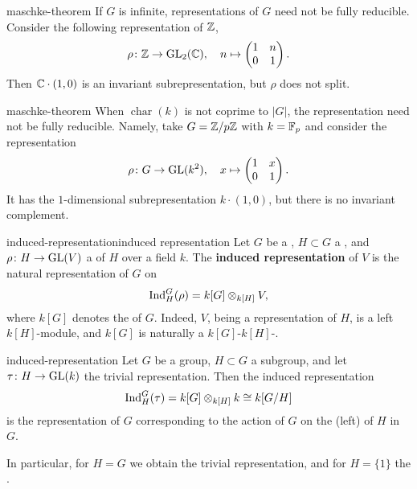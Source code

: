 \begin{example}{maschke-theorem}
    If $G$ is infinite, representations of $G$ need not be fully reducible. Consider the following representation of $\mathbb{Z}$,
    \[ \rho \colon \mathbb{Z} \to \textup{GL}_2(\mathbb{C}), \quad n \mapsto \begin{pmatrix} 1 & n \\ 0 & 1 \end{pmatrix} . \]
    Then $\mathbb{C} \cdot (1, 0)$ is an invariant subrepresentation, but $\rho$ does not split.
\end{example}

\begin{example}{maschke-theorem}
    When $\operatorname{char}(k)$ is not coprime to $|G|$, the representation need not be fully reducible. Namely, take $G = \mathbb{Z}/p\mathbb{Z}$ with $k = \mathbb{F}_p$ and consider the representation
    \[ \rho \colon G \to \textup{GL}(k^2), \quad x \mapsto \begin{pmatrix} 1 & x \\ 0 & 1 \end{pmatrix} . \]
    It has the $1$-dimensional subrepresentation $k \cdot (1, 0)$, but there is no invariant complement.
\end{example}

\begin{topic}{induced-representation}{induced representation}
    Let $G$ be a , $H \subset G$ a , and $\rho \colon H \to \textup{GL}(V)$ a  of $H$ over a field $k$. The \textbf{induced representation} of $V$ is the natural representation of $G$ on
    \[ \textup{Ind}_H^G (\rho) = k[G] \otimes_{k[H]} V , \]
    where $k[G]$ denotes the  of $G$. Indeed, $V$, being a representation of $H$, is a left $k[H]$-module, and $k[G]$ is naturally a $k[G]$-$k[H]$-.
\end{topic}

\begin{example}{induced-representation}
    Let $G$ be a group, $H \subset G$ a subgroup, and let $\tau \colon H \to \textup{GL}(k)$ the trivial representation. Then the induced representation
    \[ \textup{Ind}_H^G(\tau) = k[G] \otimes_{k[H]} k \cong k[G/H] \]
    is the representation of $G$ corresponding to the action of $G$ on the (left)  of $H$ in $G$.
    
    In particular, for $H = G$ we obtain the trivial representation, and for $H = \{ 1 \}$ the .
\end{example}

